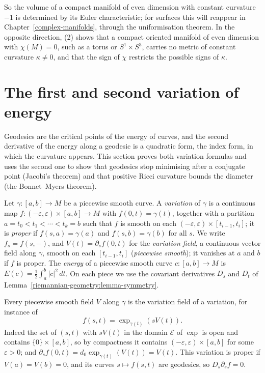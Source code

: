 So the volume of a compact manifold of even dimension with constant curvature $-1$ is determined by its Euler characteristic; for surfaces this will reappear in
Chapter~\ref{complex-manifolds}, through the uniformisation theorem. In the opposite direction, (2) shows that a compact oriented manifold of even dimension with $\chi(M) = 0$, such as
a torus or $S^1 \times S^3$, carries no metric of constant curvature $\kappa \neq 0$, and that the sign of $\chi$ restricts the possible signs of $\kappa$.

\section{The first and second variation of energy}\label{riemannian-geometry:section-variation}

Geodesics are the critical points of the energy of curves, and the second derivative of the energy along a geodesic is a quadratic form, the index form, in which
the curvature appears. This section proves both variation formulas and uses the second one to show that geodesics stop minimising after a conjugate point
(Jacobi's theorem) and that positive Ricci curvature bounds the diameter (the Bonnet--Myers theorem).

Let $\gamma \colon [a, b] \to M$ be a piecewise smooth curve. A \emph{variation} of $\gamma$ is a continuous map $f \colon (-\varepsilon, \varepsilon) \times [a, b] \to M$
with $f(0, t) = \gamma(t)$, together with a partition $a = t_0 < t_1 < \cdots < t_k = b$ such that $f$ is smooth on each $(-\varepsilon, \varepsilon) \times [t_{i-1}, t_i]$;
it is \emph{proper} if $f(s, a) = \gamma(a)$ and $f(s, b) = \gamma(b)$ for all $s$. We write $f_s = f(s, -)$, and $V(t) = \partial_sf(0, t)$ for the \emph{variation field},
a continuous vector field along $\gamma$, smooth on each $[t_{i-1}, t_i]$ (\emph{piecewise smooth}); it vanishes at $a$ and $b$ if $f$ is proper. The \emph{energy} of a
piecewise smooth curve $c \colon [a, b] \to M$ is $E(c) = \frac12\int_a^b|\dot c|^2\,dt$. On each piece we use the covariant derivatives $D_s$ and $D_t$ of
Lemma~\ref{riemannian-geometry:lemma-symmetry}.

Every piecewise smooth field $V$ along $\gamma$ is the variation field of a variation, for instance of
\[
f(s, t) = \exp_{\gamma(t)}(sV(t)) .
\]
Indeed the set of $(s, t)$ with $sV(t)$ in the domain $\mathcal{E}$ of $\exp$ is open and contains $\{0\} \times [a, b]$, so by compactness it contains
$(-\varepsilon, \varepsilon) \times [a, b]$ for some $\varepsilon > 0$; and $\partial_sf(0, t) = d_0\exp_{\gamma(t)}(V(t)) = V(t)$. This variation is proper if $V(a) = V(b) = 0$, and
its curves $s \mapsto f(s, t)$ are geodesics, so $D_s\partial_sf = 0$.

